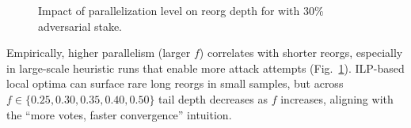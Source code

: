 \begin{figure}
\caption{Impact of parallelization level on reorg depth for \ProjBase with 30\% adversarial stake.}
\label{fig:parallelization}
\end{figure}
Empirically, higher parallelism (larger $f$) correlates with shorter reorgs, especially in large-scale heuristic runs that enable more attack attempts (Fig.~\ref{fig:parallelization}). ILP-based local optima can surface rare long reorgs in small samples, but across $f\in\{0.25,0.30,0.35,0.40,0.50\}$ tail depth decreases as $f$ increases, aligning with the “more votes, faster convergence” intuition.

